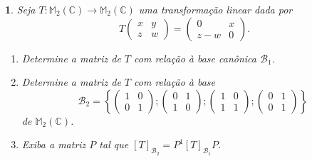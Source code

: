 \documentclass[12pt]{exam}
\newtheorem{exercicio}{}
\newcommand{\complex}{\mathbb{C}}
\newcommand{\cp}[1]{\mathbb{#1}}
\begin{document}
\begin{exercicio}
  Seja $T : \cp{M}_2(\complex) \to \cp{M}_2(\complex)$ uma transforma\c{c}\~ao linear dada por
  \[
    T \begin{pmatrix}
      x & y\\
      z & w
    \end{pmatrix} = \begin{pmatrix}
      0 & x\\
      z - w & 0
    \end{pmatrix}.
  \]
    \begin{enumerate}[label=({\alph*})]
      \item Determine a matriz de $T$ com rela\c{c}\~ao \`a base can\^onica $\mathcal{B}_1$.
      \item Determine a matriz de $T$ com rela\c{c}\~ao \`a base
      \[
        \mathcal{B}_2 = \left\{\begin{pmatrix}
          1 & 0\\
          0 & 1
        \end{pmatrix}; \begin{pmatrix}
          0 & 1\\
          1 & 0
        \end{pmatrix}; \begin{pmatrix}
          1 & 0\\
          1 & 1
        \end{pmatrix}; \begin{pmatrix}
          0 & 1\\
          0 & 1
        \end{pmatrix}\right\}
      \]
      de $\cp{M}_2(\complex)$.
      \item Exiba a matriz $P$ tal que $[T]_{\mathcal{B}_2} = P^1[T]_{\mathcal{B}_1}P$.
    \end{enumerate}
\end{exercicio}



% 
\end{document}
